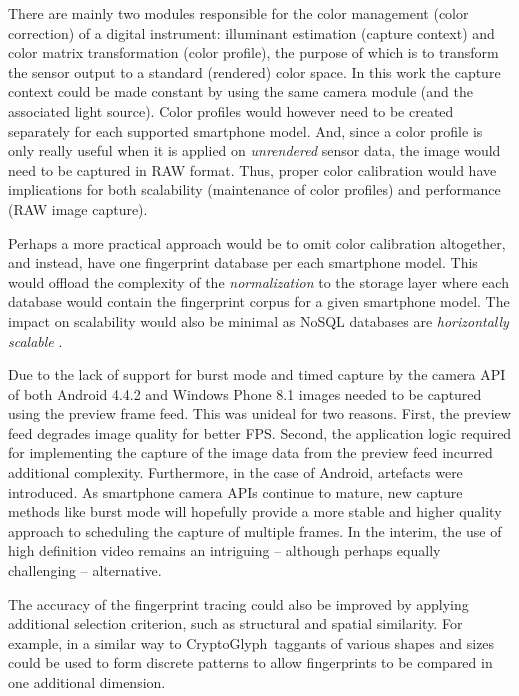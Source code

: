 \documentclass[thesis.tex]{subfiles}
\begin{document}
There are mainly two modules responsible for the color management (color correction) of a digital instrument: illuminant estimation (capture context) and color matrix transformation (color profile), the purpose of which is to transform the sensor output to a standard (rendered) color space. In this work the capture context could be made constant by using the same camera module (and the associated light source). Color profiles would however need to be created separately for each supported smartphone model. And, since a color profile is only really useful when it is applied on \emph{unrendered} sensor data, the image would need to be captured in RAW format. Thus, proper color calibration would have implications for both scalability (maintenance of color profiles) and performance (RAW image capture). \cite{multiple_cameras} \cite{color_correction_pipeline}

Perhaps a more practical approach would be to omit color calibration altogether, and instead, have one fingerprint database per each smartphone model. This would offload the complexity of the \emph{normalization} to the storage layer where each database would contain the fingerprint corpus for a given smartphone model. The impact on scalability would also be minimal as NoSQL databases are \emph{horizontally scalable} \cite{nosql_scalability}.

Due to the lack of support for burst mode and timed capture by the camera API of both Android 4.4.2 and Windows Phone 8.1 images needed to be captured using the preview frame feed. This was unideal for two reasons. First, the preview feed degrades image quality for better FPS. Second, the application logic required for implementing the capture of the image data from the preview feed incurred additional complexity. Furthermore, in the case of Android, artefacts were introduced. As smartphone camera APIs continue to mature, new capture methods like burst mode will hopefully provide a more stable and higher quality approach to scheduling the capture of multiple frames. In the interim, the use of high definition video remains an intriguing -- although perhaps equally challenging -- alternative.

The accuracy of the fingerprint tracing could also be improved by applying additional selection criterion, such as structural and spatial similarity. For example, in a similar way to CryptoGlyph\textregistered\ taggants of various shapes and sizes could be used to form discrete patterns to allow fingerprints to be compared in one additional dimension.
\end{document}
